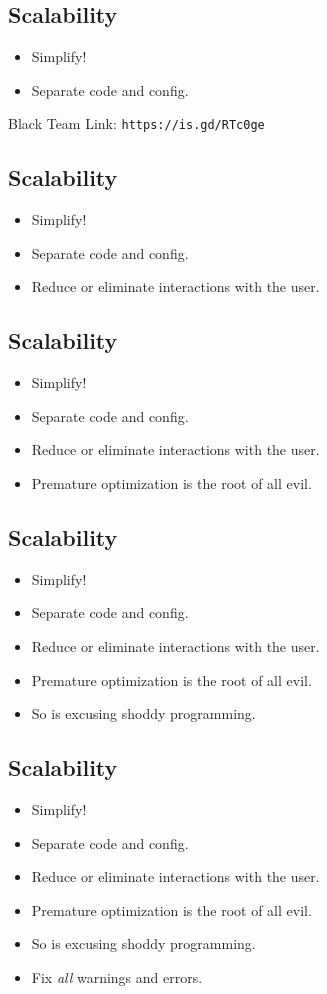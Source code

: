 \documentclass[xga]{xdvislides}
\begin{document}
\subsection{Scalability}
\begin{itemize}
	\item Simplify!
	\item Separate code and config.
\end{itemize}
\vspace{.5in}
Black Team Link: \verb+https://is.gd/RTc0ge+

\subsection{Scalability}
\begin{itemize}
	\item Simplify!
	\item Separate code and config.
	\item Reduce or eliminate interactions with the user.
\end{itemize}

\subsection{Scalability}
\begin{itemize}
	\item Simplify!
	\item Separate code and config.
	\item Reduce or eliminate interactions with the user.
	\item Premature optimization is the root of all evil.
\end{itemize}

\subsection{Scalability}
\begin{itemize}
	\item Simplify!
	\item Separate code and config.
	\item Reduce or eliminate interactions with the user.
	\item Premature optimization is the root of all evil.
	\item So is excusing shoddy programming.
\end{itemize}

\subsection{Scalability}
\begin{itemize}
	\item Simplify!
	\item Separate code and config.
	\item Reduce or eliminate interactions with the user.
	\item Premature optimization is the root of all evil.
	\item So is excusing shoddy programming.
	\item Fix {\em all} warnings and errors.
\end{itemize}
\end{document}
